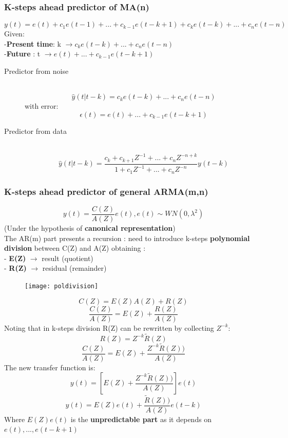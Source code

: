 \subsubsection{K-steps ahead predictor of MA(n)}
$$ y(t) = e(t)+c_1e(t-1)+...+c_{k-1}e(t-k+1)+c_ke(t-k)+...+c_ne(t-n)$$
Given:\\
-\textbf{Present time}: k $\to c_ke(t-k)+...+c_ne(t-n)$\\
-\textbf{Future} : t $\to e(t)+...+c_{k-1}e(t-k+1)$\\
\begin{description}
\item[Predictor from noise]\hfill\\
\[
\boxed{\hat{y}(t|t-k)=c_ke(t-k)+...+c_ne(t-n)}
\]
with error:
\[
\boxed{\epsilon(t)=e(t)+...+c_{k-1}e(t-k+1)}
\]
\item[Predictor from data]\hfill\\
\[
\boxed{\hat{y}(t|t-k)=\frac{c_k+c_{k+1}Z^{-1}+...+c_nZ^{-n+k}}{1+c_1Z^{-1}+...+c_nZ^{-n}}y(t-k)}
\]
\end{description}

\subsubsection{K-steps ahead predictor of general ARMA(m,n)}
$$ y(t) = \frac{C(Z)}{A(Z)}e(t) , e(t) \sim WN(0,\lambda^2)$$
(Under the hypothesis of \textbf{canonical representation})\\
The AR(m) part presents a recursion : need to introduce k-steps \textbf{polynomial division} between C(Z) and A(Z) obtaining :\\
- \textbf{E(Z)} $\to$ result (quotient)\\
- \textbf{R(Z)} $\to$ residual (remainder) \\
\begin{figure}[H]
 \centering
  \texttt{[image: poldivision]}
\end{figure}
$$C(Z)=E(Z)A(Z) + R(Z)$$
\[
\boxed{ \frac{C(Z)}{A(Z)}=E(Z) + \frac{R(Z)}{A(Z)}}
\]
Noting that in k-steps division R(Z) can be rewritten by collecting $Z^{-k}$: 
$$ R(Z) = Z^{-k}\tilde{R}(Z)$$
\[
\boxed{ \frac{C(Z)}{A(Z)}=E(Z) + \frac{Z^{-k}\tilde{R}(Z))}{A(Z)}}
\]
The new transfer function is: 
$$ y(t) = [E(Z) + \frac{Z^{-k}\tilde{R}(Z))}{A(Z)}] e(t) $$
$$ y(t) = E(Z)e(t) + \frac{\tilde{R}(Z))}{A(Z)} e(t-k) $$
Where $ E(Z)e(t) $ is the \textbf{unpredictable part} as it depends on 
$ e(t) ,...,e(t-k+1)$

